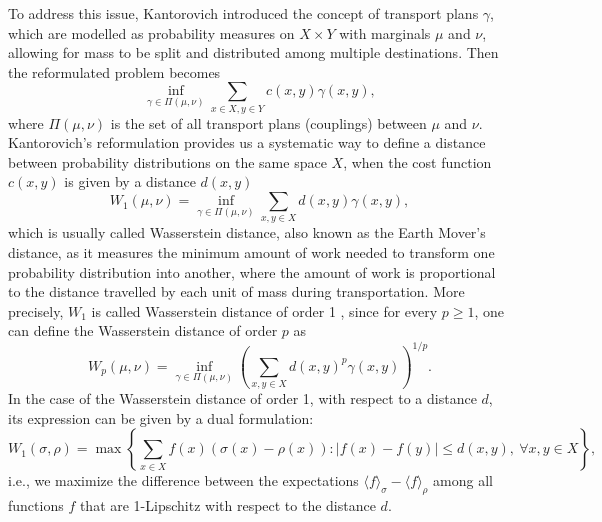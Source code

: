 \documentclass[11pt,reqno]{amsart}
\numberwithin{equation}{section}
\begin{document}
To address this issue, Kantorovich \cite{kantorovich1942translocation} introduced the concept of transport plans $ \gamma $, which are modelled as probability measures on $ X \times Y $ with marginals $ \mu $ and $ \nu $, allowing for mass to be split and distributed among multiple destinations. Then the reformulated problem becomes
$$
\inf_{\gamma \in \Pi(\mu, \nu)} \sum_{x \in X, y\in Y} c(x, y) \gamma(x, y),
$$
where $ \Pi(\mu, \nu) $ is the set of all transport plans (couplings) between $ \mu $ and $ \nu $. Kantorovich's reformulation provides us a systematic way to define a distance between probability distributions on the same space $X$, when the cost function $c(x,y)$ is given by a distance $d(x,y)$
\begin{equation}\label{def:Wasserstein distance}
    W_1(\mu,\nu) = \inf_{\gamma \in \Pi(\mu, \nu)} \sum_{x, y\in X} d(x, y) \gamma(x, y),
\end{equation}
which is usually called Wasserstein distance, also known as the Earth Mover's distance, as it measures the minimum amount of work needed to transform one probability distribution into another, where the amount of work is proportional to the distance travelled by each unit of mass during transportation. More precisely, $W_1$ is called Wasserstein distance of order 1 , since for every $p \geq 1$, one can define the Wasserstein distance of order $p$ as
$$W_p(\mu,\nu)=\inf_{\gamma \in \Pi(\mu, \nu)} \left(\sum_{x, y\in X} d(x, y)^p \gamma(x, y)\right)^{1 / p}.$$
In the case of the Wasserstein distance of order 1, with respect to a distance $d$, its expression can be given by a dual formulation:
\begin{equation}\label{def:dual formualtion classical}
    W_1(\sigma, \rho)=\max \left\{\sum_{x \in X} f(x)(\sigma(x)-\rho(x)):|f(x)-f(y)| \leq d(x, y),\ \forall x, y \in X\right\},
\end{equation}
i.e., we maximize the difference between the expectations $\langle f\rangle_\sigma-\langle f\rangle_\rho$ among all functions $f$ that are 1-Lipschitz with respect to the distance $d$. 

\end{document}
